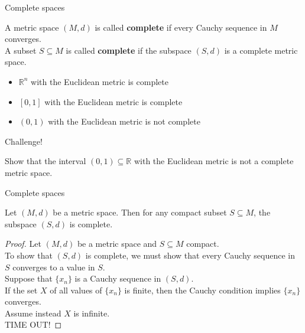 \documentclass{beamer}
\begin{document}
\begin{frame}{Complete spaces}
\begin{defn}
A metric space $(M,d)$ is called \textbf{complete} if every Cauchy sequence in $M$ converges.\\
\pause
A subset $S\subseteq M$ is called \textbf{complete} if the subspace $(S,d)$ is a complete metric space.
\end{defn}
\begin{itemize}
\pause
\item $\mathbb R^n$ with the Euclidean metric is complete
\pause
\item $[0,1]$ with the Euclidean metric is complete
\pause
\item $(0,1)$ with the Euclidean metric is not complete
\end{itemize}
\end{frame}

\begin{frame}{Challenge!}
\begin{prob}
Show that the interval $(0,1)\subseteq\mathbb{R}$ with the Euclidean metric is not a complete metric space.
\end{prob}
\end{frame}


\begin{frame}{Complete spaces}
\begin{thm}
Let $(M,d)$ be a metric space.
\pause
Then for any compact subset $S\subseteq M$, the subspace $(S,d)$ is complete.
\end{thm}
\pause
\begin{proof}
\pause
Let $(M,d)$ be a metric space and $S\subseteq M$ compact.\\
\pause
To show that $(S,d)$ is complete, we must show that every Cauchy sequence in $S$ converges to a value in $S$.\\
\pause
Suppose that $\{x_n\}$ is a Cauchy sequence in $(S,d)$.\\
\pause
If the set $X$ of all values of $\{x_n\}$ is finite, then the Cauchy condition implies $\{x_n\}$ converges.\\
\pause
Assume instead $X$ is infinite.\\
\pause
TIME OUT!
\end{proof}
\end{frame}
\end{document}
